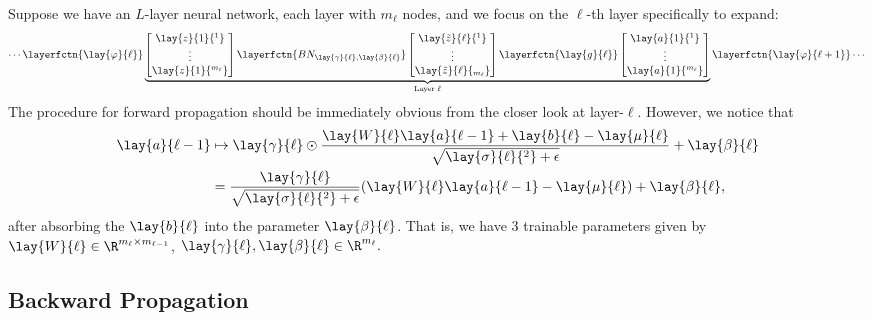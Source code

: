 Suppose we have an $L$-layer neural network, each layer with $m_\ell$ nodes, and we focus on the $\ell$-th layer specifically to expand:
\begin{equation*}
	\cdots\layerfctn{\lay{\varphi}{\ell}}
	\underbrace{
		\begin{bmatrix}
			\lay{z}{1}{^1}\\
			\vdots\\
			\lay{z}{1}{^{m_\ell}}
		\end{bmatrix}
		\layerfctn{BN_{\lay{\gamma}{\ell},\lay{\beta}{\ell}}}
		\begin{bmatrix}
			\lay{\tilde{z}}{\ell}{^1}\\
			\vdots\\
			\lay{\tilde{z}}{\ell}{_{m_\ell}}
		\end{bmatrix}
		\layerfctn{\lay{g}{\ell}}
		\begin{bmatrix}
			\lay{a}{1}{^1}\\
			\vdots\\
			\lay{a}{1}{^{m_\ell}}
		\end{bmatrix}
		}_{\text{Layer } \ell}
	\layerfctn{\lay{\varphi}{\ell+1}}\cdots
\end{equation*}
The procedure for forward propagation should be immediately obvious from the closer look at layer-$\ell$. However, we notice that
\begin{align*}
	\lay{a}{\ell-1}&\mapsto\lay{\gamma}{\ell}\odot\frac{\lay{W}{\ell}\lay{a}{\ell-1}+\lay{b}{\ell}-\lay{\mu}{\ell}}{\sqrt{\lay{\sigma}{\ell}{^2}+\epsilon}}+\lay{\beta}{\ell}\\
	&=\frac{\lay{\gamma}{\ell}}{\sqrt{\lay{\sigma}{\ell}{^2}+\epsilon}}(\lay{W}{\ell}\lay{a}{\ell-1}-\lay{\mu}{\ell})+\lay{\beta}{\ell},
\end{align*}
after absorbing the $\lay{b}{\ell}$ into the parameter $\lay{\beta}{\ell}$.  That is, we have $3$ trainable parameters given by $\lay{W}{\ell}\in\R^{m_{\ell}\times m_{\ell-1}}$, $\lay{\gamma}{\ell},\lay{\beta}{\ell}\in\R^{m_\ell}.$




\subsection{Backward Propagation}


